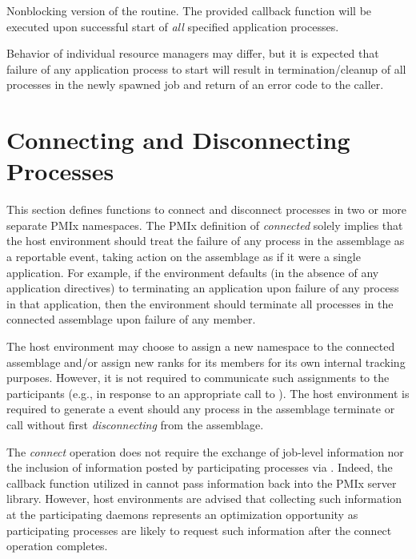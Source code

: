 \optattrend

\descr

Nonblocking version of the  routine. The provided callback function will be executed upon successful start of \textit{all} specified application processes.

\adviceuserstart
Behavior of individual resource managers may differ, but it is expected that failure of any application process to start will result in termination/cleanup of all processes in the newly spawned job and return of an error code to the caller.
\adviceuserend



\section{Connecting and Disconnecting Processes}
\label{chap:api_proc_mgmt:connect}

This section defines functions to connect and disconnect processes in two or more separate \ac{PMIx} namespaces. The \ac{PMIx} definition of \textit{connected} solely implies that the host environment should treat the failure of any process in the assemblage as a reportable event, taking action on the assemblage as if it were a single application. For example, if the environment defaults (in the absence of any application directives) to terminating an application upon failure of any process in that application, then the environment should terminate all processes in the connected assemblage upon failure of any member.

\advicermstart
The host environment may choose to assign a new namespace to the connected assemblage and/or assign new ranks for its members for its own internal tracking purposes. However, it is not required to communicate such assignments to the participants (e.g., in response to an appropriate call to ). The host environment is required to generate a  event should any process in the assemblage terminate or call  without first \textit{disconnecting} from the assemblage.

The \textit{connect} operation does not require the exchange of job-level information nor the inclusion of information posted by  participating processes via . Indeed, the callback function utilized in  cannot pass information back into the \ac{PMIx} server library. However, host environments are advised that collecting such information at the participating daemons represents an optimization opportunity as participating processes are likely to request such information after the connect operation completes.
\advicermend

